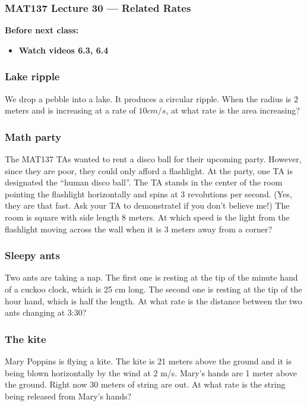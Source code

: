 \documentclass[14pt]{beamer}
\date{}
\title{}
\author{}
\begin{document}
\begin{frame}
	\frametitle{MAT137 Lecture 30 --- Related Rates}

	\vfill
	{\bf Before next class:}
		\begin{itemize} \normalsize
			\item {\bf Watch videos 6.3, 6.4}
		\end{itemize}
\end{frame}

	\begin{frame}[t]
		\frametitle{Lake ripple}

		We drop a pebble into a lake. It produces a circular ripple. When the radius
		is $2$ meters and is increasing at a rate of $10cm/s$, at what rate is the area
		increasing?
	\end{frame}

	\begin{frame}[t]
		\frametitle{Math party}

		The MAT137 TAs wanted to rent a disco ball for their upcoming party. However,
		since they are poor, they could only afford a flashlight. At the party, one TA
		is designated the ``human disco ball''. The TA stands in the center of the
		room pointing the flashlight horizontally and spins at 3 revolutions per
		second. (Yes, they are that fast. Ask your TA to demonstratel if you don't
		believe me!) The room is square with side length 8 meters. At which speed is
		the light from the flashlight moving across the wall when it is 3 meters away
		from a corner?
	\end{frame}
	\begin{frame}[t]
		\frametitle{Sleepy ants}

		Two ants are taking a nap. The first one is resting at the tip of the minute
		hand of a cuckoo clock, which is 25 cm long. The second one is resting at the
		tip of the hour hand, which is half the length. At what rate is the distance
		between the two ants changing at 3:30?
	\end{frame}
	\begin{frame}[t]
		\frametitle{The kite}

		Mary Poppins is flying a kite. The kite is 21 meters above the ground and it
		is being blown horizontally by the wind at 2 m/s. Mary's hands are 1 meter
		above the ground. Right now 30 meters of string are out. At what rate is the
		string being released from Mary's hands?
	\end{frame}
\end{document}
